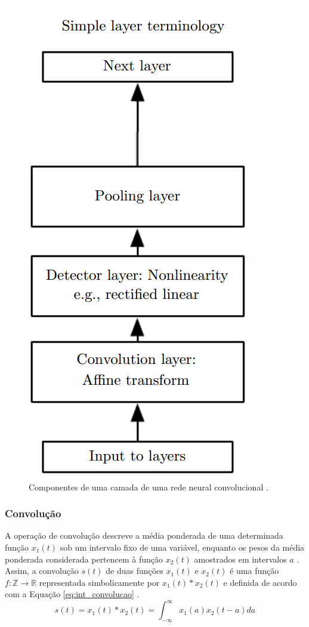 \begin{figure}
	\centering
	\includegraphics[height=0.5\textheight]{img/cnn_camada.png}
	\caption{Componentes de uma camada de uma rede neural convolucional \cite{goodfellow2016deep}. }
	\label{fig:cnn_camada}
\end{figure}


\subsubsection{Convolução}
A operação de convolução descreve a média ponderada de uma determinada função $x_1(t)$ sob um intervalo fixo de uma variável, enquanto os pesos da média ponderada considerada pertencem à função $x_2(t)$ amostrados em intervalos $a$ \cite{bracewell1986fourier}. Assim, a convolução $s(t)$ de duas funções $x_1(t)$ e $x_2(t)$ é uma função $f: \mathds{Z} \rightarrow \mathds{R}$ representada simbolicamente por $x_1(t) * x_2(t)$ e definida de acordo com a Equação \ref{eq:int_convolucao} \cite{lathi2006sinais}.
\begin{equation}\label{eq:int_convolucao}
	s(t) = x_1(t) * x_2(t) = \int_{-\infty}^{\infty} x_1(a) x_2(t-a)da
\end{equation}

